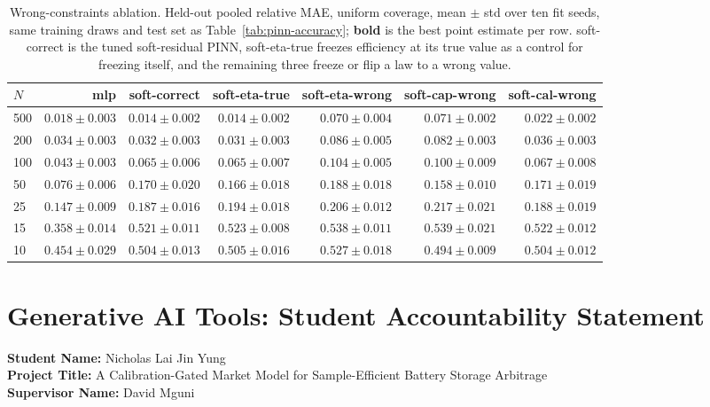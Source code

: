 \documentclass[conference]{IEEEtran}
\begin{document}
\begin{table}[htbp]
\centering
\caption{Wrong-constraints ablation. Held-out pooled relative MAE, uniform coverage, mean $\pm$ std over ten fit seeds, same training draws and test set as Table~\ref{tab:pinn-accuracy}; \textbf{bold} is the best point estimate per row. soft-correct is the tuned soft-residual PINN, soft-eta-true freezes efficiency at its true value as a control for freezing itself, and the remaining three freeze or flip a law to a wrong value.}
\label{tab:pinn-wrong}
\small
\begin{tabular}{lrrrrrr}
\toprule
$N$ & mlp & soft-correct & soft-eta-true & soft-eta-wrong & soft-cap-wrong & soft-cal-wrong \\
\midrule
500 & $0.018\pm0.003$ & $0.014\pm0.002$ & $\mathbf{0.014\pm0.002}$ & $0.070\pm0.004$ & $0.071\pm0.002$ & $0.022\pm0.002$ \\
200 & $0.034\pm0.003$ & $0.032\pm0.003$ & $\mathbf{0.031\pm0.003}$ & $0.086\pm0.005$ & $0.082\pm0.003$ & $0.036\pm0.003$ \\
100 & $\mathbf{0.043\pm0.003}$ & $0.065\pm0.006$ & $0.065\pm0.007$ & $0.104\pm0.005$ & $0.100\pm0.009$ & $0.067\pm0.008$ \\
50 & $\mathbf{0.076\pm0.006}$ & $0.170\pm0.020$ & $0.166\pm0.018$ & $0.188\pm0.018$ & $0.158\pm0.010$ & $0.171\pm0.019$ \\
25 & $\mathbf{0.147\pm0.009}$ & $0.187\pm0.016$ & $0.194\pm0.018$ & $0.206\pm0.012$ & $0.217\pm0.021$ & $0.188\pm0.019$ \\
15 & $\mathbf{0.358\pm0.014}$ & $0.521\pm0.011$ & $0.523\pm0.008$ & $0.538\pm0.011$ & $0.539\pm0.021$ & $0.522\pm0.012$ \\
10 & $\mathbf{0.454\pm0.029}$ & $0.504\pm0.013$ & $0.505\pm0.016$ & $0.527\pm0.018$ & $0.494\pm0.009$ & $0.504\pm0.012$ \\
\bottomrule
\end{tabular}
\end{table}

\clearpage
\section{Generative AI Tools: Student Accountability Statement}
\label{app:genai}

\noindent\textbf{Student Name:} Nicholas Lai Jin Yung \\
\textbf{Project Title:} A Calibration-Gated Market Model for Sample-Efficient Battery Storage Arbitrage \\
\textbf{Supervisor Name:} David Mguni
\end{document}

